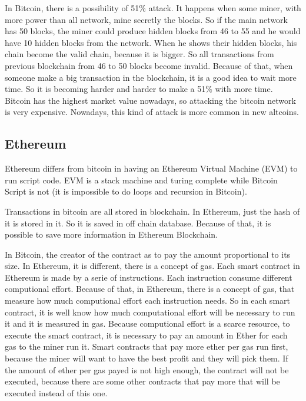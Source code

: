 \documentclass[12pt]{article}
\begin{document}
In Bitcoin, there is a possibility of 51\% attack.
It happens when some miner, with more power than all network, mine secretly the blocks.
So if the main network has 50 blocks, the miner could produce hidden blocks from 46 to 55
and he would have 10 hidden blocks from the network.
When he shows their hidden blocks, his chain become the valid chain, because it is bigger.
So all transactions from previous blockchain from 46 to 50 blocks become invalid.
Because of that, when someone make a big transaction in the blockchain, it is a good idea to wait more time.
So it is becoming harder and harder to make a 51\% with more time.
Bitcoin has the highest market value nowadays, so attacking the bitcoin network is very expensive.
Nowadays, this kind of attack is more common in new altcoins.

\subsection{Ethereum}

Ethereum differs from bitcoin in having an Ethereum Virtual Machine (EVM) to run script code.
EVM is a stack machine and turing complete while Bitcoin Script is not
(it is impossible to do loops and recursion in Bitcoin).

Transactions in bitcoin are all stored in blockchain.
In Ethereum, just the hash of it is stored in it.
So it is saved in off chain database.
Because of that, it is possible to save more information in Ethereum Blockchain.

In Bitcoin, the creator of the contract as to pay the amount proportional to its size.
In Ethereum, it is different, there is a concept of gas.
Each smart contract in Ethereum is made by a serie of instructions.
Each instruction consume different computional effort.
Because of that, in Ethereum, there is a concept of gas, that measure how much computional effort
each instruction needs.
So in each smart contract, it is well know how much computational effort will be necessary to run it
and it is measured in gas.
Because computional effort is a scarce resource, to execute the smart contract, it is necessary to
pay an amount in Ether for each gas to the miner run it.
Smart contracts that pay more ether per gas run first, because the miner will want to have the best
profit and they will pick them.
If the amount of ether per gas payed is not high enough, the contract will not be executed,
because there are some other contracts that pay more that will be executed instead of this one.
\end{document}

